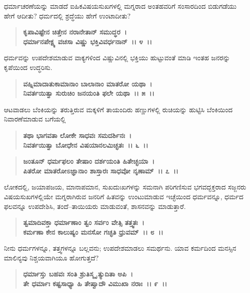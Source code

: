 ಧರ್ಮಾಚರಣೆಯನ್ನು ಮಾಡದೆ ಐಹಿಕವಿಷಯಸುಖಗಳಲ್ಲಿ ಮಗ್ನರಾದ ಅಂತಹವರಿಗೆ ಸಂಸಾರದಿಂದ ಬಿಡುಗಡೆಯು ಹೇಗೆ ಆದೀತು? ಧರ್ಮದಲ್ಲಿ ಶ್ರದ್ಧೆಯು ಹೇಗೆ ಉಂಟಾದೀತು?

\begin{verse}
\textbf{ಕೃಪಾವಿಷ್ಟೇನ ಚಿತ್ತೇನ ನರಾನೇತಾನ್ ಸಮುದ್ಧರ~।}\\\textbf{ಧರ್ಮಾನಪೇಕ್ಷ್ಯ ವಚಸಾ ವಿಷ್ಣು ಭಕ್ತಿವಿವರ್ಧನಾನ್~।। ೪~।।}
\end{verse}

ಧರ್ಮವನ್ನು ಉಪದೇಶಮಾಡುವ ವಾಕ್ಯಗಳಿಂದ ವಿಷ್ಣುವಿನಲ್ಲಿ ಭಕ್ತಿಯು ಹುಟ್ಟುವಂತೆ ಮಾಡಿ ಇಂತಹ ಜನರನ್ನು ಕೃಪೆಯಿಂದ ಉದ್ಧರಿಸು.

\begin{verse}
\textbf{ವಹ್ನಿಮಾದಾತುಕಾಮಾನಾಂ ಬಾಲಾನಾಂ ಮಾತರೋ ಯಥಾ~।}\\\textbf{ನಿವರ್ತಯಿತ್ವಾ ಸುರುಚಿಂ ಜನಯಂತಿ ಫಲೇ ಯಥಾ~।। ೫~।।}
\end{verse}

ಆಟವಾಡಲು ಬೆಂಕಿಯನ್ನು ತರುತ್ತಿರುವ ಮಕ್ಕಳಿಗೆ ತಾಯಂದಿರು ಹಣ್ಣುಗಳಲ್ಲಿ ರುಚಿಯನ್ನು ಹುಟ್ಟಿಸಿ ಬೆಂಕಿಯಿಂದ ನಿವಾರಣೆಮಾಡುವ ಬಗೆಯಲ್ಲಿ

\begin{verse}
\textbf{ತಥಾ ಭಾಗವತಾ ಲೋಕೇ ಸಾಧವಃ ಸಮದರ್ಶಿನಃ~।}\\\textbf{ನಿವರ್ತಯಿತ್ವಾ ಬೋಧೇನ ವಿಷಯಾನಲಮಿಚ್ಛತಃ~।। ೬~।।}
\end{verse}

\begin{verse}
\textbf{ಜಂತೂನ್ ಧರ್ಮಫಲಂ ತೇಷಾಂ ದರ್ಶಯಂತಿ ಹಿತೇಚ್ಛಯಾ~।}\\\textbf{ಪಿತರೋ ಮಾತರೋಽಜ್ಞಾನಾಂ ಶಾಸ್ತಾರಃ ಸಾಧವೋ ನೃಣಾಮ್~।। ೭~।।}
\end{verse}

ಲೋಕದಲ್ಲಿ, ಜಯಾಪಜಯ, ಮಾನಾಪಮಾನ, ಸುಖದುಃಖಗಳನ್ನು ಸಮನಾಗಿ ಪರಿಗಣಿಸುವ ಭಗವದ್ಭಕ್ತರಾದ ಸಜ್ಜನರು ವಿಷಯಸುಖಗಳಲ್ಲಿಯೇ ಮಗ್ನರಾಗಿರುವ ಜನರಿಗೆ ಹಿತವನ್ನು ಉಂಟುಮಾಡುವ ಇಚ್ಛೆಯಿಂದ ಧರ್ಮವನ್ನೂ, ಧರ್ಮದ ಫಲವನ್ನೂ ಉಪದೇಶಿಸಿ, ತಂದೆ–ತಾಯಿಯರು ಮಾಡುವಂತೆ, ಶಾಸನವನ್ನು ಮಾಡುತ್ತಾರೆ.

\begin{verse}
\textbf{ತ್ವಮಾದಿವಕ್ತಾ ಧರ್ಮಾಣಾಂ ತ್ವಂ ಸರ್ವಂ ವೇತ್ಸಿ ತತ್ತ್ವತಃ~।}\\\textbf{ಕರ್ಮಣಾ ಕೇನ ಕಾಲುಷ್ಯಂ ಮನಸೋ ಗಚ್ಛತಿ ಧ್ರುವಮ್~।। ೮~।।}
\end{verse}

ನೀನು ಧರ್ಮಗಳನ್ನೂ, ತತ್ತ್ವಗಳನ್ನೂ ಬಲ್ಲವನು; ಉಪದೇಶಮಾಡಲು ಸಮರ್ಥನು. ಯಾವ ಕರ್ಮದಿಂದ ಮನಸ್ಸಿನ ಮಾಲಿನ್ಯವು ನಿಶ್ಚಯವಾಗಿಯೂ ಹೋಗುತ್ತದೆ?

\begin{verse}
\textbf{ಧರ್ಮಾಸ್ತು ಬಹವಃ ಸಂತಿ ಶ್ರುತಿಸ್ಮೃ ತ್ಯುದಿತಾ ಅಪಿ~।}\\\textbf{ತೇ ಧರ್ಮಾಃ ಕಷ್ಟಸಾಧ್ಯಾ ಹಿ ತೇಷ್ವಾದೌ ವಿಮುಖಾ ನರಾಃ~।। ೯~।।}
\end{verse}

